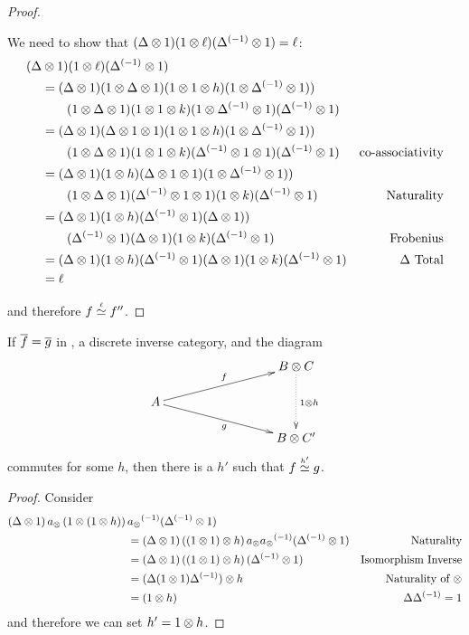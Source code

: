 \begin{proof}
\begin{description}
      We need to show that $(\Delta \otimes 1)(1 \otimes \ell)({\Delta}^{(-1)}\otimes1) = \ell$:
      \begin{align*}
        (\Delta &\otimes 1)(1 \otimes \ell)({\Delta}^{(-1)}\otimes1) \\
        &=
          (\Delta \otimes 1)(1\otimes\Delta \otimes 1)  (1\otimes1 \otimes h ) (1\otimes{\Delta}^{(-1)}\otimes 1))\\
          &\qquad
            (1\otimes\Delta \otimes 1) (1\otimes 1 \otimes k) (1\otimes{\Delta}^{(-1)}\otimes 1)({\Delta}^{(-1)}\otimes 1)\\
        &=
          (\Delta \otimes 1)(\Delta \otimes 1\otimes1)  (1\otimes1 \otimes h ) (1\otimes{\Delta}^{(-1)}\otimes 1))\\
          & \qquad
            (1\otimes\Delta \otimes 1) (1\otimes 1 \otimes k) ({\Delta}^{(-1)}\otimes1\otimes 1)({\Delta}^{(-1)}\otimes 1)
              &\text{co-associativity}\\
        &=
          (\Delta \otimes 1)  (1 \otimes h ) (\Delta \otimes 1\otimes1)(1\otimes{\Delta}^{(-1)}\otimes 1)) \\
          &\qquad
            (1\otimes\Delta \otimes 1)  ({\Delta}^{(-1)}\otimes1\otimes 1)(1 \otimes k)({\Delta}^{(-1)}\otimes 1)&\text{Naturality}\\
        &=
          (\Delta \otimes 1)  (1 \otimes h ) ({\Delta}^{(-1)} \otimes1)(\Delta\otimes 1)) \\
          &\qquad
            ({\Delta}^{(-1)} \otimes 1)  (\Delta \otimes 1)(1 \otimes k)({\Delta}^{(-1)}\otimes 1)&\text{Frobenius}\\
        &=
          (\Delta \otimes 1)  (1 \otimes h ) ({\Delta}^{(-1)} \otimes1)
          (\Delta \otimes 1)(1 \otimes k)({\Delta}^{(-1)}\otimes 1)&\Delta\text{ Total}\\
        &= \ell
      \end{align*}
  \end{description}
  and therefore $f\overset{\scriptscriptstyle \ell}{\simeq}f''$.
\end{proof}

\begin{corollary}\label{cor:equivalence_simplified_diagram}
  If $\overline{f} = \overline{g}$ in \X, a discrete inverse category, and the diagram
  \[
    \xymatrix @C=40pt @R=15pt{
      & & B \* C \ar@{.>}[dd]^{1\*h}\\
      A \ar[urr]^f \ar[drr]_{g}\\
      && B\* C'
    }
  \]
  commutes for some $h$, then there is a $h'$ such that $f\overset{\scriptscriptstyle h'}{\simeq}g$.
\end{corollary}
\begin{proof}
  Consider
  \begin{align*}
    (\Delta \otimes1)\,a_{\otimes}\,(1\otimes(1\otimes h))\,&{a_{\otimes}}^{(-1)}({\Delta}^{(-1)}\otimes1)\\
    & = (\Delta \otimes1)\,((1\otimes1)\otimes h)\,a_{\otimes}{a_{\otimes}}^{(-1)}({\Delta}^{(-1)}\otimes1) & \text{Naturality}\\
    &=(\Delta \otimes1)\,((1\otimes1)\otimes h)\,({\Delta}^{(-1)}\otimes1) & \text{Isomorphism Inverse}\\
    &=(\Delta (1\otimes1) {\Delta}^{(-1)})\otimes h & \text{Naturality of }\otimes\\
    &=(1\otimes h) & \Delta  {\Delta}^{(-1)}=1\\
  \end{align*}
  and therefore we can set $h' = 1 \otimes h$.
\end{proof}

